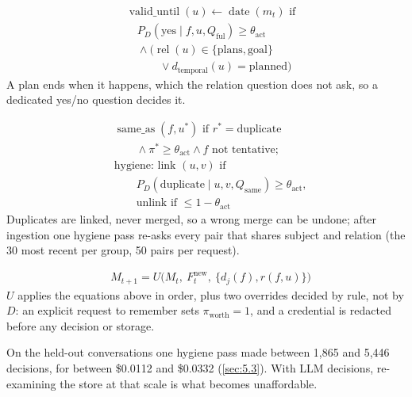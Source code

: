 \documentclass[11pt]{article}
\newcommand{\src}[1]{}
\begin{document}
\begin{align}
& \operatorname{valid\_until}(u) \leftarrow \operatorname{date}(m_t) \text{ if} \nonumber\\
& \quad P_D(\text{yes} \mid f, u, Q_{\text{ful}}) \ge \theta_{\text{act}} \nonumber\\
& \quad \wedge \bigl(\operatorname{rel}(u) \in \{\text{plans}, \text{goal}\} \nonumber\\
& \qquad\quad \vee d_{\text{temporal}}(u) = \text{planned}\bigr) \label{eq:plan}
\end{align}
A plan ends when it happens, which the relation question does not ask, so a dedicated yes/no question decides it.

\begin{align}
& \operatorname{same\_as}(f, u^{*}) \text{ if } r^{*} = \text{duplicate} \nonumber\\
& \qquad \wedge \pi^{*} \ge \theta_{\text{act}} \wedge f \text{ not tentative}; \nonumber\\
& \text{hygiene: link } (u,v) \text{ if} \nonumber\\
& \qquad P_D(\text{duplicate} \mid u, v, Q_{\text{same}}) \ge \theta_{\text{act}}, \nonumber\\
& \qquad \text{unlink if } \le 1 - \theta_{\text{act}} \label{eq:links}
\end{align}
Duplicates are linked, never merged, so a wrong merge can be undone; after ingestion one hygiene pass re-asks every pair that shares subject and relation (the 30\src{src/engram/pipeline/hygiene.py (MAX\_GROUP)} most recent per group, 50\src{src/engram/pipeline/hygiene.py} pairs per request).

\begin{align}
& M_{t+1} = U\bigl(M_t,\ F^{\text{new}}_t,\ \{d_j(f), r(f,u)\}\bigr) \label{eq:write}
\end{align}
$U$ applies the equations above in order, plus two overrides decided by rule, not by $D$: an explicit request to remember sets $\pi_{\text{worth}} = 1$, and a credential is redacted before any decision or storage.

On the held-out conversations one hygiene pass made between 1,865\src{bench/results/e4\_belief\_v2\_\_heldout\_conv-30\_\_k3.json} and 5,446\src{bench/results/e4\_belief\_v2\_\_heldout\_conv-42\_\_k3.json} decisions, for between \$0.0112\src{bench/results/e4\_belief\_v2\_\_heldout\_conv-30\_\_k3.json} and \$0.0332\src{bench/results/e4\_belief\_v2\_\_heldout\_conv-42\_\_k3.json} (\cref{sec:5.3}). With LLM decisions, re-examining the store at that scale is what becomes unaffordable.
\end{document}
